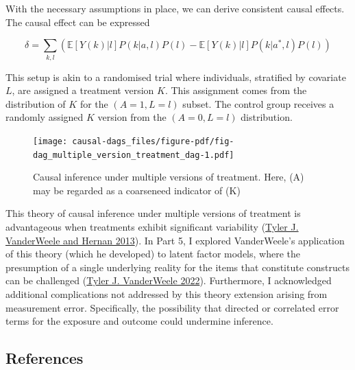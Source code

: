\documentclass[
  singlecolumn]{article}
\begin{document}
With the necessary assumptions in place, we can derive consistent causal
effects. The causal effect can be expressed

\[ \delta = \sum_{k,l} \left( \mathbb{E}[Y(k)|l] P(k|a,l) P(l) - \mathbb{E}[Y(k)|l] P(k|a^*,l) P(l) \right) \]

This setup is akin to a randomised trial where individuals, stratified
by covariate \(L\), are assigned a treatment version \(K\). This
assignment comes from the distribution of \(K\) for the
\((A = 1, L = l)\) subset. The control group receives a randomly
assigned \(K\) version from the \((A = 0, L = l)\) distribution.

\begin{figure}

{\centering \texttt{[image: causal-dags\_files/figure-pdf/fig-dag\_multiple\_version\_treatment\_dag-1.pdf]}

}

\caption{\label{fig-dag_multiple_version_treatment_dag}Causal inference
under multiple versions of treatment. Here, (A) may be regarded as a
coarseneed indicator of (K)}

\end{figure}

This theory of causal inference under multiple versions of treatment is
advantageous when treatments exhibit significant variability
(\protect\hyperlink{ref-vanderweele2013}{Tyler J. VanderWeele and Hernan
2013}). In Part 5, I explored VanderWeele's application of this theory
(which he developed) to latent factor models, where the presumption of a
single underlying reality for the items that constitute constructs can
be challenged (\protect\hyperlink{ref-vanderweele2022}{Tyler J.
VanderWeele 2022}). Furthermore, I acknowledged additional complications
not addressed by this theory extension arising from measurement error.
Specifically, the possibility that directed or correlated error terms
for the exposure and outcome could undermine inference.

\newpage{}

\hypertarget{references}{%
\subsection*{References}\label{references}}
\end{document}

